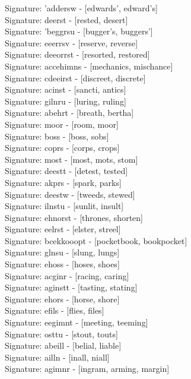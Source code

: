Signature: {'addersw} - [edwards', edward's] \\
Signature: {deerst} - [rested, desert] \\
Signature: {'beggrsu} - [bugger's, buggers'] \\
Signature: {eeerrsv} - [reserve, reverse] \\
Signature: {deeorrst} - [resorted, restored] \\
Signature: {accehimns} - [mechanics, mischance] \\
Signature: {cdeeirst} - [discreet, discrete] \\
Signature: {acinst} - [sancti, antics] \\
Signature: {gilnru} - [luring, ruling] \\
Signature: {abehrt} - [breath, bertha] \\
Signature: {moor} - [room, moor] \\
Signature: {boss} - [boss, sobs] \\
Signature: {coprs} - [corps, crops] \\
Signature: {most} - [most, mots, stom] \\
Signature: {deestt} - [detest, tested] \\
Signature: {akprs} - [spark, parks] \\
Signature: {deestw} - [tweeds, stewed] \\
Signature: {ilnstu} - [sunlit, insult] \\
Signature: {ehnorst} - [thrones, shorten] \\
Signature: {eelrst} - [elster, streel] \\
Signature: {bcekkooopt} - [pocketbook, bookpocket] \\
Signature: {glnsu} - [slung, lungs] \\
Signature: {ehoss} - [hoses, shoes] \\
Signature: {acginr} - [racing, caring] \\
Signature: {aginstt} - [tasting, stating] \\
Signature: {ehors} - [horse, shore] \\
Signature: {efils} - [flies, files] \\
Signature: {eegimnt} - [meeting, teeming] \\
Signature: {osttu} - [stout, touts] \\
Signature: {abeill} - [belial, liable] \\
Signature: {ailln} - [inall, niall] \\
Signature: {agimnr} - [ingram, arming, margin] \\
